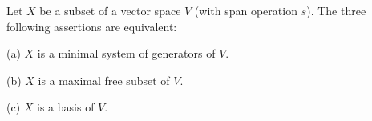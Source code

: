 Let $X$ be a subset of a vector space $V$ (with span operation $s$). The three following assertions are equivalent:

(a) $X$ is a minimal system of generators of $V$.

(b) $X$ is a maximal free subset of $V$.

(c) $X$ is a basis of $V$.
